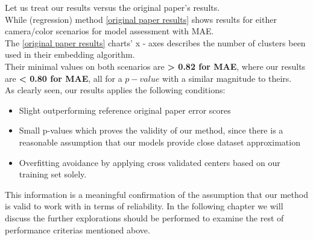 Let us treat our results versus the original paper's results.\\

While \cite{perp_color} (regression) method
\ref{original paper results} shows results for either camera/color scenarios for model assessment with MAE. \\
The \ref{original paper results} charts' x - axes describes the number of clusters been used in their embedding algorithm. \\
Their minimal values on both scenarios are \textbf{ > 0.82 for MAE}, where our results are \textbf{ < 0.80 for MAE}, all for a $p-value$ with a similar magnitude to theirs. \\
As clearly seen, our results applies the following conditions:
\begin{itemize}
	\item Slight outperforming reference original paper error scores
	\item Small p-values which proves the validity of our method, since there is a reasonable assumption that our models provide close dataset approximation
	\item Overfitting avoidance by applying cross validated centers based on our training set solely.
\end{itemize}

This information is a meaningful confirmation of the assumption that our method is valid to work with in terms of reliability. In the following chapter we will discuss the further explorations should be performed to examine the rest of performance criterias mentioned above.
